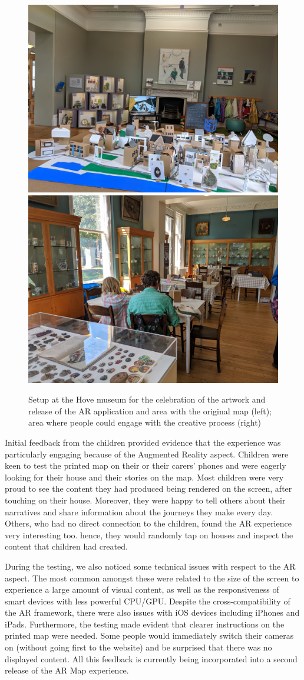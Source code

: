 \documentclass[acmlarge,screen,dvipsnames]{acmart}
\begin{document}
\begin{figure}[ht] \centering
\includegraphics[width=0.48\linewidth]{images/IMG_20190720_103105.jpg}
\includegraphics[width=0.48\linewidth]{images/IMG_20190720_151644.jpg}
\caption{Setup at the Hove museum for the celebration of the artwork and
release of the AR application and area with the original map (left); area
where people could engage with the creative process (right)} \label{fig:museum}
\end{figure}
 
Initial feedback from the children provided evidence that the experience was
particularly engaging because of the Augmented Reality aspect. Children were keen to test
the printed map on their or their carers' phones and were eagerly looking for their house and their stories on the map.
Most children were very proud to see the content they had produced being
rendered on the screen, after touching on their house. Moreover, they were happy to tell
others about their narratives and share information about the journeys they make every day. Others, who had no
direct connection to the children, found the AR experience very interesting too.
hence, they would randomly tap on houses and inspect the content that children had created.
 
 During the testing, we also noticed some technical issues with respect to the AR aspect. The
 most common amongst these were related to the size of the screen to experience a large
 amount of visual content, as well as the responsiveness of smart devices with less
 powerful CPU/GPU. Despite the cross-compatibility of the AR framework, there
 were also issues with iOS devices including iPhones and iPads. Furthermore,
 the testing made evident that clearer instructions on the printed map
 were needed. Some people would immediately switch their cameras on (without
 going first to the website) and be surprised that there was no displayed content. All this feedback is currently being incorporated into a second release of the AR Map experience. 
\end{document}
